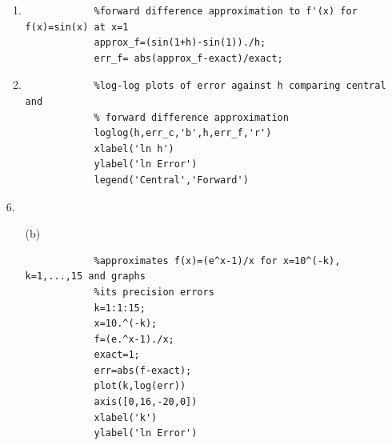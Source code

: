 \documentclass[11pt,a4paper]{article}
\begin{document}
\begin{enumerate}
\begin{enumerate}
		\item
		\begin{verbatim}
			%forward difference approximation to f'(x) for f(x)=sin(x) at x=1
			approx_f=(sin(1+h)-sin(1))./h;
			err_f= abs(approx_f-exact)/exact;
		\end{verbatim}
		
		\item
		\begin{verbatim}
			%log-log plots of error against h comparing central and
			% forward difference approximation
			loglog(h,err_c,'b',h,err_f,'r')
			xlabel('ln h')
			ylabel('ln Error')
			legend('Central','Forward')
		\end{verbatim}
	\end{enumerate}
	
	\item[6.]
	\begin{enumerate}
		\item[(b)]
		\begin{verbatim}
			%approximates f(x)=(e^x-1)/x for x=10^(-k), k=1,...,15 and graphs
			%its precision errors
			k=1:1:15;
			x=10.^(-k);
			f=(e.^x-1)./x;
			exact=1;
			err=abs(f-exact);
			plot(k,log(err))
			axis([0,16,-20,0])
			xlabel('k')
			ylabel('ln Error')
		\end{verbatim}
	\end{enumerate}
	
\end{enumerate}
\end{document}
